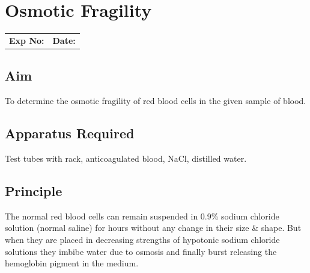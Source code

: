 \documentclass[a4paper,12pt,openany,twoside]{book}
\begin{document}
													\chapter*{\centering Osmotic Fragility}
													\begin{tabular}{p{5in} p{1in}}
														\textbf{Exp No:}  & \textbf{Date:}\\
													\end{tabular}

													\section*{Aim}

														To determine the osmotic fragility of red blood cells in the given sample of blood.
														\section*{Apparatus Required}
														Test tubes with rack, anticoagulated blood, NaCl, distilled water.
														\section*{Principle}
														The normal red blood cells can remain suspended in 0.9\% sodium chloride solution (normal saline) for hours without any change in their size \& shape. But when they are placed in decreasing strengths of hypotonic sodium chloride solutions they imbibe water due to osmosis and finally burst releasing the hemoglobin pigment in the medium.
\end{document}
